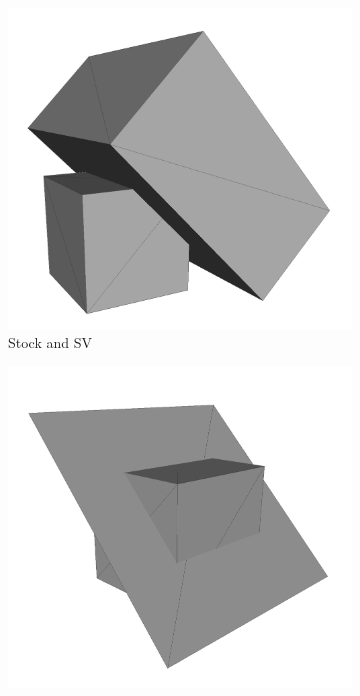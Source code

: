 \begin{figure}
	\centering
	\begin{subfigure}[t]{0.3\textwidth}
		\centering
		\includegraphics[width=\textwidth]{images/cube2_stock_sv}
		\caption{Stock and SV}
		\label{fig:cube2_stock_sv}
	\end{subfigure}
	\begin{subfigure}[t]{0.3\textwidth}
		\centering
		\includegraphics[width=\textwidth]{images/cube2_classified}

\end{subfigure}
\end{figure}
